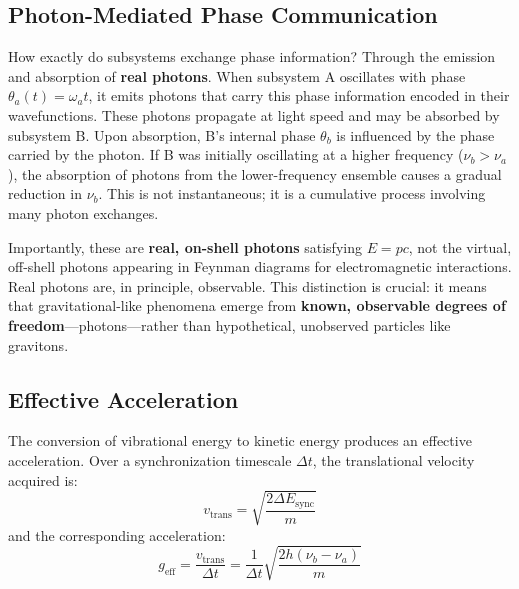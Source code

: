 \documentclass[12pt,letterpaper]{article}
\begin{document}

\subsection{Photon-Mediated Phase Communication}
\label{subsec:photon_communication}

How exactly do subsystems exchange phase information? Through the emission and absorption of \textbf{real photons}. When subsystem A oscillates with phase $\theta_a(t) = \omega_a t$, it emits photons that carry this phase information encoded in their wavefunctions. These photons propagate at light speed and may be absorbed by subsystem B. Upon absorption, B's internal phase $\theta_b$ is influenced by the phase carried by the photon. If B was initially oscillating at a higher frequency ($\nu_b > \nu_a$), the absorption of photons from the lower-frequency ensemble causes a gradual reduction in $\nu_b$. This is not instantaneous; it is a cumulative process involving many photon exchanges.

Importantly, these are \textbf{real, on-shell photons} satisfying $E = pc$, not the virtual, off-shell photons appearing in Feynman diagrams for electromagnetic interactions. Real photons are, in principle, observable. This distinction is crucial: it means that gravitational-like phenomena emerge from \textbf{known, observable degrees of freedom}---photons---rather than hypothetical, unobserved particles like gravitons.


\subsection{Effective Acceleration}
\label{subsec:effective_acceleration}

The conversion of vibrational energy to kinetic energy produces an effective acceleration. Over a synchronization timescale $\Delta t$, the translational velocity acquired is:
\begin{equation}
v_\text{trans} = \sqrt{\frac{2 \Delta E_\text{sync}}{m}}
\end{equation}
and the corresponding acceleration:
\begin{equation}
g_\text{eff} = \frac{v_\text{trans}}{\Delta t} = \frac{1}{\Delta t} \sqrt{\frac{2 h (\nu_b - \nu_a)}{m}}
\end{equation}
\end{document}
